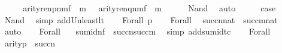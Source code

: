 \begin{isabellebody}
\ \ \isamarkupfalse%
\ \isamarkupfalse%
\ {\isachardoublequoteopen}arity{\isacharparenleft}{\kern0pt}ren{\isacharparenleft}{\kern0pt}p{\isacharparenright}{\kern0pt}{\isacharbackquote}{\kern0pt}n{\isacharbackquote}{\kern0pt}m{\isacharbackquote}{\kern0pt}f{\isacharparenright}{\kern0pt}\ {\isasymle}\ m{\isachardoublequoteclose}\ \ \ {\isachardoublequoteopen}arity{\isacharparenleft}{\kern0pt}ren{\isacharparenleft}{\kern0pt}q{\isacharparenright}{\kern0pt}{\isacharbackquote}{\kern0pt}n{\isacharbackquote}{\kern0pt}m{\isacharbackquote}{\kern0pt}f{\isacharparenright}{\kern0pt}\ {\isasymle}\ m{\isachardoublequoteclose}\isanewline
\ \ \ \ \isamarkupfalse%
\ Nand\ \isamarkupfalse%
\ auto\isanewline
\ \ \isamarkupfalse%
\ \isamarkupfalse%
\ {\isacharquery}{\kern0pt}case\ \isamarkupfalse%
\ Nand\ \isamarkupfalse%
\ {\isacharparenleft}{\kern0pt}simp\ add{\isacharcolon}{\kern0pt}Un{\isacharunderscore}{\kern0pt}least{\isacharunderscore}{\kern0pt}lt{\isacharparenright}{\kern0pt}\isanewline
{}\isamarkupfalse%
\isanewline
\ \ \isamarkupfalse%
\ {\isacharparenleft}{\kern0pt}Forall\ p{\isacharparenright}{\kern0pt}\isanewline
\ \ \isamarkupfalse%
\ Forall\ \isamarkupfalse%
\ {\isachardoublequoteopen}succ{\isacharparenleft}{\kern0pt}n{\isacharparenright}{\kern0pt}{\isasymin}nat{\isachardoublequoteclose}\ \ {\isachardoublequoteopen}succ{\isacharparenleft}{\kern0pt}m{\isacharparenright}{\kern0pt}{\isasymin}nat{\isachardoublequoteclose}\ \isamarkupfalse%
\ auto\isanewline
\ \ \isamarkupfalse%
\ Forall\ \isamarkupfalse%
\ {}{\isacharcolon}{\kern0pt}\ {\isachardoublequoteopen}sum{\isacharunderscore}{\kern0pt}id{\isacharparenleft}{\kern0pt}n{\isacharcomma}{\kern0pt}f{\isacharparenright}{\kern0pt}\ {\isasymin}\ succ{\isacharparenleft}{\kern0pt}n{\isacharparenright}{\kern0pt}{\isasymrightarrow}succ{\isacharparenleft}{\kern0pt}m{\isacharparenright}{\kern0pt}{\isachardoublequoteclose}\ \isamarkupfalse%
\ {\isacharparenleft}{\kern0pt}simp\ add{\isacharcolon}{\kern0pt}sum{\isacharunderscore}{\kern0pt}id{\isacharunderscore}{\kern0pt}tc{\isacharparenright}{\kern0pt}\isanewline
\ \ \isamarkupfalse%
\ Forall\ \isamarkupfalse%
\ {}{\isacharcolon}{\kern0pt}{\isachardoublequoteopen}arity{\isacharparenleft}{\kern0pt}p{\isacharparenright}{\kern0pt}\ {\isasymle}\ succ{\isacharparenleft}{\kern0pt}n{\isacharparenright}{\kern0pt}{\isachardoublequoteclose}\ \isamarkupfalse%

\end{isabellebody}
